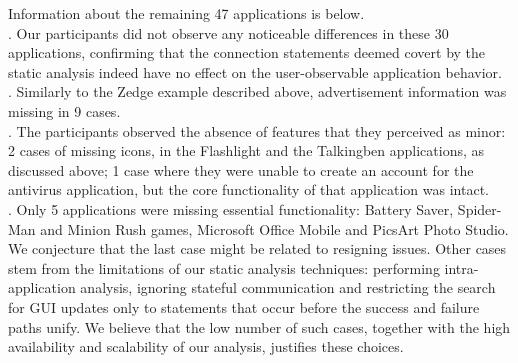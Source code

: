 
Information about the remaining 47 applications is below.
\\
{}.
Our participants did not observe any noticeable differences in these 30 applications, confirming 
that the connection statements deemed covert by the static analysis indeed have no effect on the user-observable application behavior. 
\\
. 
Similarly to the Zedge example described above, advertisement information was missing in 9 cases. 
\\
. 
The participants observed the absence of features that they perceived as minor: 2 cases of missing icons, in the Flashlight and the Talkingben applications, as discussed above; 1 case where they were unable to create an account for the antivirus application, but the core functionality of that application was intact. 
\\
.
Only 5 applications were missing essential functionality: %
Battery Saver, Spider-Man and Minion Rush games, Microsoft Office Mobile and PicsArt Photo Studio. We conjecture that the last case might be related to resigning issues. %
Other cases stem from the limitations of our static analysis techniques: performing intra-application analysis, ignoring stateful communication and restricting the search for GUI updates only to statements that occur before the success and failure paths unify.
We believe that the low number of such cases, together with the high availability and scalability of our analysis, justifies these choices.   


